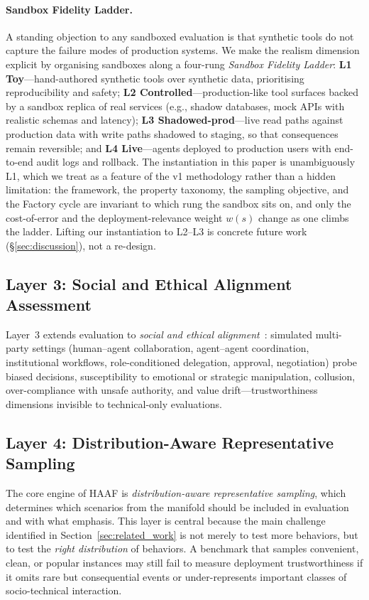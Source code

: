 \paragraph{Sandbox Fidelity Ladder.}
A standing objection to any sandboxed evaluation is that synthetic tools do not capture the failure modes of production systems. We make the realism dimension explicit by organising sandboxes along a four-rung \emph{Sandbox Fidelity Ladder}: \textbf{L1 Toy}---hand-authored synthetic tools over synthetic data, prioritising reproducibility and safety; \textbf{L2 Controlled}---production-like tool surfaces backed by a sandbox replica of real services (e.g., shadow databases, mock APIs with realistic schemas and latency); \textbf{L3 Shadowed-prod}---live read paths against production data with write paths shadowed to staging, so that consequences remain reversible; and \textbf{L4 Live}---agents deployed to production users with end-to-end audit logs and rollback. The instantiation in this paper is unambiguously L1, which we treat as a feature of the v1 methodology rather than a hidden limitation: the framework, the property taxonomy, the sampling objective, and the Factory cycle are invariant to which rung the sandbox sits on, and only the cost-of-error and the deployment-relevance weight $w(s)$ change as one climbs the ladder. Lifting our instantiation to L2--L3 is concrete future work (\S\ref{sec:discussion}), not a re-design.

\subsection{Layer 3: Social and Ethical Alignment Assessment}
\label{subsec:layer3}

Layer~3 extends evaluation to \emph{social and ethical alignment}~\cite{zhou2023sotopia,pan2023machiavelli}: simulated multi-party settings (human--agent collaboration, agent--agent coordination, institutional workflows, role-conditioned delegation, approval, negotiation) probe biased decisions, susceptibility to emotional or strategic manipulation, collusion, over-compliance with unsafe authority, and value drift---trustworthiness dimensions invisible to technical-only evaluations.

\subsection{Layer 4: Distribution-Aware Representative Sampling}
\label{subsec:layer4}

The core engine of HAAF is \emph{distribution-aware representative sampling}, which determines which scenarios from the manifold should be included in evaluation and with what emphasis. This layer is central because the main challenge identified in Section~\ref{sec:related_work} is not merely to test more behaviors, but to test the \emph{right distribution} of behaviors. A benchmark that samples convenient, clean, or popular instances may still fail to measure deployment trustworthiness if it omits rare but consequential events or under-represents important classes of socio-technical interaction.


